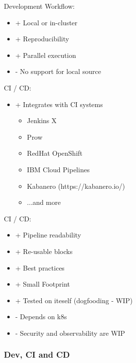 \documentclass[aspectratio=169,11pt,hyperref={colorlinks=true}]{beamer}
\begin{document}
\begin{lblackrwhiteframe}
\begin{lblackrwhiteframe}
\begin{blackframe}
\begin{whiteframe}
\begin{2columnsframe}
  {
    Development Workflow:
    \begin{itemize}
      \item + Local or in-cluster
      \item + Reproducibility
      \item + Parallel execution
      \item - No support for local source
    \end{itemize}
    CI / CD:
    \begin{itemize}
      \item + Integrates with CI systems
      \begin{itemize}
        \item Jenkins X
        \item Prow
        \item RedHat OpenShift
        \item IBM Cloud Pipelines
        \item Kabanero (https://kabanero.io/)
        \item ...and more
      \end{itemize}
    \end{itemize}
  }
  {
    CI / CD:
    \begin{itemize}
      \item + Pipeline readability
      \item + Re-usable blocks
      \item + Best practices
      \item + Small Footprint
      \item + Tested on iteself (dogfooding - WIP)
      \item - Depends on k8s
      \item - Security and observability are WIP
    \end{itemize}
  }
  \frametitle{Dev, CI and CD}
\end{2columnsframe}


\end{whiteframe}
\end{blackframe}
\end{lblackrwhiteframe}
\end{lblackrwhiteframe}
\end{document}
